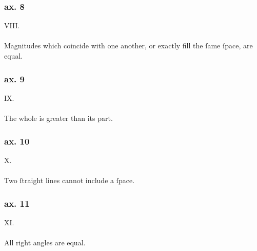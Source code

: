 \begin{minipage}{0.67\textwidth}
    \subsubsection{ax. 8}
    \begin{center}
        VIII.\label{ax8}\\
        \hfill\\
        Magnitudes which coincide with one another, or exactly fill the ſame ſpace, are equal.
    \end{center}
\end{minipage}

\hfill

\begin{minipage}{0.67\textwidth}
    \subsubsection{ax. 9}
    \begin{center}
        IX.\label{ax9}\\
        \hfill\\
        The whole is greater than its part.\\
    \end{center}
    \subsubsection{ax. 10}
    \begin{center}
        X.\label{ax10}\\
        \hfill\\
        Two ſtraight lines cannot include a ſpace.\\
    \end{center}
    \subsubsection{ax. 11}
    \begin{center}
        XI.\label{ax11}\\
        \hfill\\
        All right angles are equal.\\
    \end{center}
\end{minipage}%
\begin{minipage}{0.33\textwidth}
    \phantom{}
\end{minipage}

